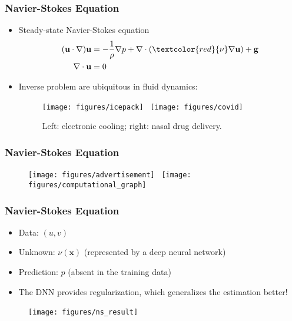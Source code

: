 \documentclass[usenames,dvipsnames]{beamer}
\begin{document}
\begin{frame}
	\frametitle{Navier-Stokes Equation}
	\begin{itemize}
		\item Steady-state Navier-Stokes equation
		\begin{equation*}
		\begin{aligned}
		(\mathbf{u} \cdot \nabla) \mathbf{u} &=
		-\frac{1}{\rho} \nabla p + \nabla\cdot (\textcolor{red}{\nu} \nabla \mathbf{u}) + \mathbf{g}\\
		\nabla \cdot \mathbf{u} &= 0
		\end{aligned}
		\end{equation*}
		
		\item Inverse problem are ubiquitous in fluid dynamics:
		
		\begin{figure}[hbt]
			\centering
			\texttt{[image: figures/icepack]}~
			\texttt{[image: figures/covid]}
			\caption{Left: electronic cooling; right: nasal drug delivery.}
		\end{figure}
		
	\end{itemize}
	
\end{frame}


\begin{frame}
	\frametitle{Navier-Stokes Equation}
	
	\begin{figure}[hbt]
		\centering
		\texttt{[image: figures/advertisement]}~
		\texttt{[image: figures/computational\_graph]}
	\end{figure}
\end{frame}



\begin{frame}
	\frametitle{Navier-Stokes Equation}
	\begin{itemize}
		\item Data: $(u, v)$
		\item Unknown: $\nu(\mathbf{x})$ (represented by a deep neural network)
		\item Prediction: $p$ (absent in the training data) 
		\item The DNN provides regularization, which generalizes the estimation better!
	\end{itemize}
	\begin{figure}[hbt]
		\centering
		\texttt{[image: figures/ns\_result]}~
	\end{figure}
\end{frame}
\end{document}
